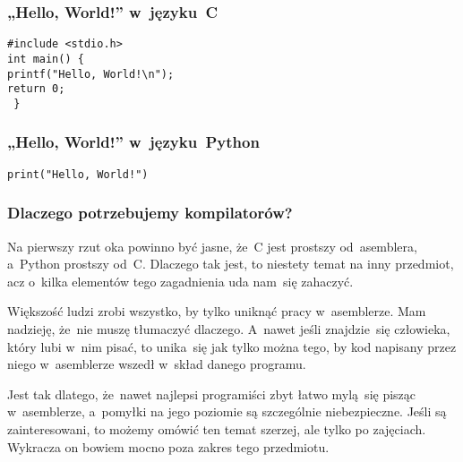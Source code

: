 \documentclass[10pt,t]{beamer}
\begin{document}
\begin{frame}
  \frametitle{„Hello, World!” w~języku~C}


  \texttt{\#include <stdio.h>} \\
  \vspace{0.8em}
  \texttt{int main() \{ } \\
  \hphantom{aaaa} \texttt{printf("Hello, World!\textbackslash n");} \\
  \vspace{0.8em}
  \vspace{0.8em}
  \vspace{0.8em}
  \vspace{0.8em}
  \hphantom{aaaa} \texttt{return 0;} \\
  \texttt{ \} }

\end{frame}





\begin{frame}
  \frametitle{„Hello, World!” w~języku~Python}


  \texttt{print("Hello, World!")}

\end{frame}




\begin{frame}
  \frametitle{Dlaczego potrzebujemy kompilatorów?}


  Na pierwszy rzut oka powinno być jasne, że~C jest prostszy od~asemblera,
  a~Python prostszy od~C. Dlaczego tak jest, to niestety temat na inny
  przedmiot, acz o~kilka elementów tego zagadnienia uda nam~się zahaczyć.

  Większość ludzi zrobi wszystko, by tylko uniknąć pracy w~asemblerze.
  Mam nadzieję, że~nie muszę tłumaczyć dlaczego.  A~nawet jeśli
  znajdzie~się człowieka, który lubi w~nim pisać, to unika~się jak tylko
  można tego, by kod napisany przez niego w~asemblerze wszedł w~skład
  danego programu.

  Jest tak dlatego, że~nawet najlepsi programiści zbyt łatwo mylą~się
  pisząc w~asemblerze, a~pomyłki na jego poziomie są szczególnie
  niebezpieczne. Jeśli są zainteresowani, to możemy omówić ten temat
  szerzej, ale tylko po zajęciach. Wykracza on bowiem mocno poza zakres tego
  przedmiotu.

\end{frame}
\end{document}
